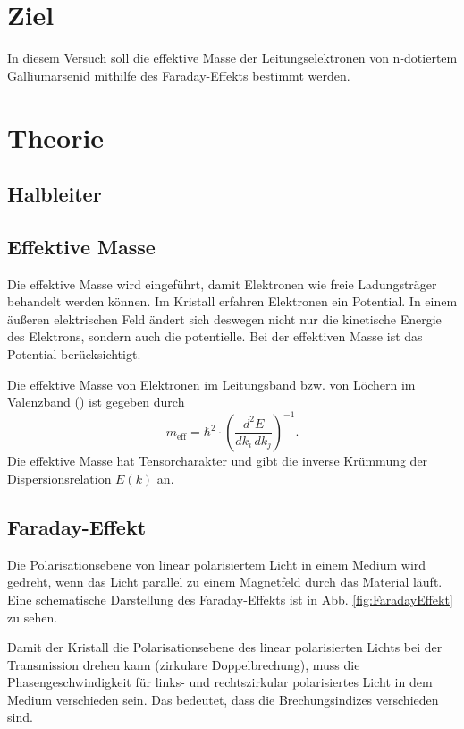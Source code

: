 \section{Ziel}
In diesem Versuch soll die effektive Masse der Leitungselektronen von n-dotiertem Galliumarsenid mithilfe des Faraday-Effekts bestimmt werden.

\section{Theorie}
\label{sec:Theorie}

\subsection{Halbleiter}


\subsection{Effektive Masse}
Die effektive Masse wird eingeführt, damit Elektronen wie freie Ladungsträger behandelt werden können. Im Kristall erfahren Elektronen ein Potential. In einem äußeren elektrischen Feld ändert sich deswegen nicht nur die kinetische Energie des Elektrons, sondern auch die potentielle. Bei der effektiven Masse ist das Potential berücksichtigt. \cite{demtroeder}

Die effektive Masse von Elektronen im Leitungsband bzw. von Löchern im Valenzband (\cite{demtroeder}) ist gegeben durch
\begin{equation*}
    m_\text{eff} = \hbar^2 \cdot \left( \frac{d^2 E}{dk_i \, dk_j} \right)^{-1}.
\end{equation*}
Die effektive Masse hat Tensorcharakter und gibt die inverse Krümmung der Dispersionsrelation $E(k)$ an. \cite{demtroeder}

\subsection{Faraday-Effekt}
Die Polarisationsebene von linear polarisiertem Licht in einem Medium wird gedreht, wenn das Licht parallel zu einem Magnetfeld durch das Material läuft. \cite{heintze}
Eine schematische Darstellung des Faraday-Effekts ist in Abb. \ref{fig:FaradayEffekt} zu sehen.

Damit der Kristall die Polarisationsebene des linear polarisierten Lichts bei der Transmission drehen kann (zirkulare Doppelbrechung), muss die Phasengeschwindigkeit für links- und rechtszirkular polarisiertes Licht in dem Medium verschieden sein. Das bedeutet, dass die Brechungsindizes verschieden sind. \cite{V46}

